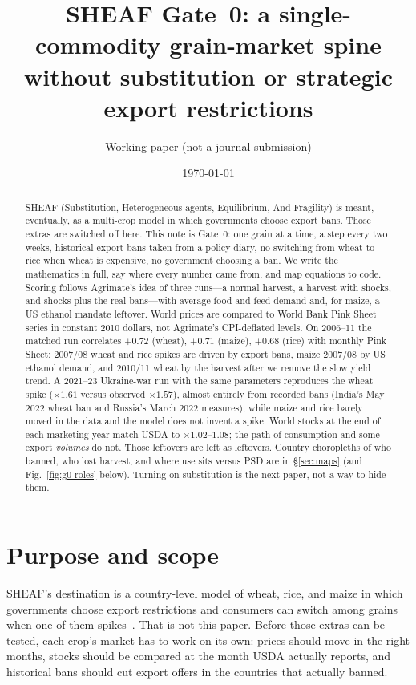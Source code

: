 \documentclass[11pt,a4paper]{article}
\title{SHEAF Gate~0: a single-commodity grain-market spine\\
without substitution or strategic export restrictions}
\author{Working paper (not a journal submission)}
\date{\today}
\begin{document}
\maketitle

\begin{abstract}
SHEAF (Substitution, Heterogeneous agents, Equilibrium, And Fragility) is
meant, eventually, as a multi-crop model in which governments choose export
bans. Those extras are switched off here. This note is Gate~0: one grain at
a time, a step every two weeks, historical export bans taken from a policy
diary, no switching from wheat to rice when wheat is expensive, no government
choosing a ban. We write the mathematics in full, say where every number
came from, and map equations to code. Scoring follows Agrimate's idea of
three runs---a normal harvest, a harvest with shocks, and shocks plus the
real bans---with average food-and-feed demand and, for maize, a US ethanol
mandate leftover. World prices are compared to World Bank Pink Sheet series
in constant 2010 dollars, not Agrimate's CPI-deflated levels. On 2006--11
the matched run correlates $+0.72$ (wheat), $+0.71$ (maize), $+0.68$ (rice)
with monthly Pink Sheet; 2007/08 wheat and rice spikes are driven by export
bans, maize 2007/08 by US ethanol demand, and 2010/11 wheat by the harvest
after we remove the slow yield trend. A 2021--23 Ukraine-war run with the
same parameters reproduces the wheat spike ($\times 1.61$ versus observed
$\times 1.57$), almost entirely from recorded bans (India's May 2022 wheat
ban and Russia's March 2022 measures), while maize and rice barely moved in
the data and the model does not invent a spike. World stocks at the end of
each marketing year match USDA to $\times 1.02$--$1.08$; the path of
consumption and some export \emph{volumes} do not. Those leftovers are left
as leftovers. Country choropleths of who banned, who lost harvest, and
where use sits versus PSD are in \S\ref{sec:maps} (and Fig.~\ref{fig:g0-roles}
below). Turning on substitution is the next paper, not a way to hide them.
\end{abstract}

\tableofcontents
\vspace{1em}

\section{Purpose and scope}
\label{sec:scope}

SHEAF's destination is a country-level model of wheat, rice, and maize in
which governments choose export restrictions and consumers can switch among
grains when one of them spikes~\citep{kuhla2025,schewe2017}. That is not this
paper. Before those extras can be tested, each crop's market has to work on
its own: prices should move in the right months, stocks should be compared
at the month USDA actually reports, and historical bans should cut export
offers in the countries that actually banned.
\end{document}
